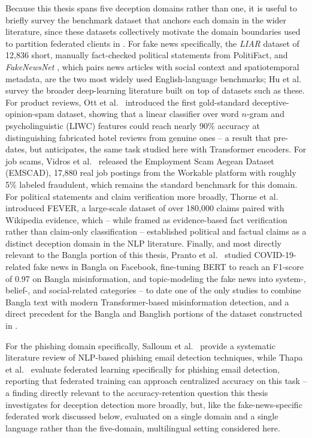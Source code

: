 Because this thesis spans five deception domains rather than one, it is useful to briefly survey the benchmark dataset that anchors each domain in the wider literature, since these datasets collectively motivate the domain boundaries used to partition federated clients in . For fake news specifically, the \emph{LIAR} dataset \cite{wang2017liar} of 12{,}836 short, manually fact-checked political statements from PolitiFact, and \emph{FakeNewsNet} \cite{shu2020fakenewsnet}, which pairs news articles with social context and spatiotemporal metadata, are the two most widely used English-language benchmarks; Hu et al.\ \cite{hu2022deep} survey the broader deep-learning literature built on top of datasets such as these. For product reviews, Ott et al.\ \cite{ott2011finding} introduced the first gold-standard deceptive-opinion-spam dataset, showing that a linear classifier over word $n$-gram and psycholinguistic (LIWC) features could reach nearly 90\% accuracy at distinguishing fabricated hotel reviews from genuine ones -- a result that pre-dates, but anticipates, the same task studied here with Transformer encoders. For job scams, Vidros et al.\ \cite{vidros2017automatic} released the Employment Scam Aegean Dataset (EMSCAD), 17{,}880 real job postings from the Workable platform with roughly 5\% labeled fraudulent, which remains the standard benchmark for this domain. For political statements and claim verification more broadly, Thorne et al.\ \cite{thorne2018fever} introduced FEVER, a large-scale dataset of over 180{,}000 claims paired with Wikipedia evidence, which -- while framed as evidence-based fact verification rather than claim-only classification -- established political and factual claims as a distinct deception domain in the NLP literature. Finally, and most directly relevant to the Bangla portion of this thesis, Pranto et al.\ \cite{pranto2022misinformed} studied COVID-19-related fake news in Bangla on Facebook, fine-tuning BERT to reach an F1-score of 0.97 on Bangla misinformation, and topic-modeling the fake news into system-, belief-, and social-related categories -- to date one of the only studies to combine Bangla text with modern Transformer-based misinformation detection, and a direct precedent for the Bangla and Banglish portions of the dataset constructed in .

For the phishing domain specifically, Salloum et al.\ \cite{salloum2022systematic} provide a systematic literature review of NLP-based phishing email detection techniques, while Thapa et al.\ \cite{thapa2023evaluation} evaluate federated learning specifically for phishing email detection, reporting that federated training can approach centralized accuracy on this task -- a finding directly relevant to the accuracy-retention question this thesis investigates for deception detection more broadly, but, like the fake-news-specific federated work discussed below, evaluated on a single domain and a single language rather than the five-domain, multilingual setting considered here.


